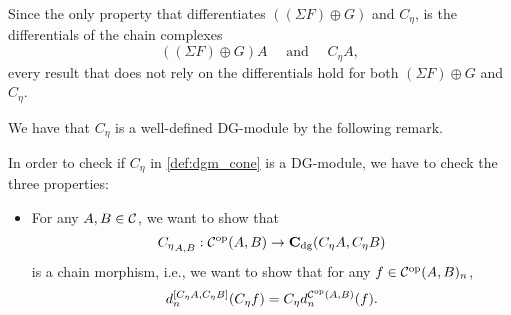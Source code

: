 \begin{remark}
    \label{rem:dgm_c_eta_similar_to_sigma_f_plus_g}
    Since the only property that differentiates \( ((\Sigma F) \oplus G) \) and \( C_{\eta} \), is the differentials of the chain complexes
    \[
        ((\Sigma F) \oplus G) A \quad \text{ and } \quad C_{\eta} A,
    \]
    every result that does not rely on the differentials hold for both \( (\Sigma F) \oplus G \) and \( C_{\eta} \).
\end{remark}

We have that \( C_{\eta} \) is a well-defined DG-module by the following remark.
\begin{remark}
    In order to check if \( C_{\eta} \) in \autoref{def:dgm_cone} is a DG-module, we have to check the three properties:
    \begin{itemize}
        \item {
            For any \( A, B \in {\mathcal{C}} \), we want to show that
            \[
                {C_{\eta}}_{A, B}: {\mathcal{C}}^{\operatorname{op}}(A, B) \to \operatorname{\mathbf{C}}_{\operatorname{dg}}(C_{\eta} A, C_{\eta} B)
            \]
            is a chain morphism, i.e., we want to show that for any \( f \in {\mathcal{C}}^{\operatorname{op}}(A, B)_n \),
            \[
                d_n^{[C_{\eta} A, C_{\eta} B]} (C_{\eta} f) = C_{\eta} d_n^{{\mathcal{C}}^{\operatorname{op}}(A, B)}(f).
            \]

}
\end{itemize}
\end{remark}
